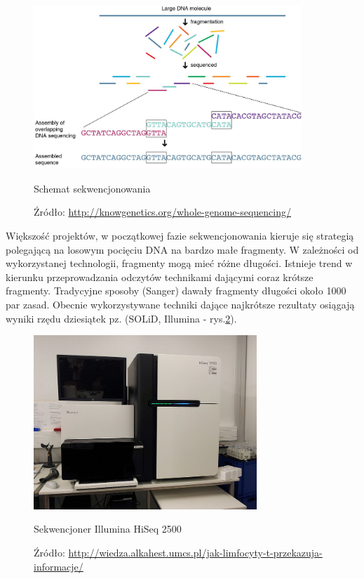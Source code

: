 \begin{figure}[h]
	\centering
	\includegraphics[width=0.9\textwidth]{img/sequenctioning-process.png}
	\caption{Schemat sekwencjonowania}
	\vspace{-0.5cm}
	\caption*{\scriptsize Źródło: \url{http://knowgenetics.org/whole-genome-sequencing/}}
	\label{img:schemat-sekwencjonowania}
\end{figure}

Większość projektów, w początkowej fazie sekwencjonowania kieruje się strategią polegającą na losowym pocięciu DNA na bardzo małe fragmenty.
W zależności od wykorzystanej technologii, fragmenty mogą mieć różne długości. Istnieje trend w kierunku przeprowadzania odczytów technikami dającymi coraz krótsze fragmenty. 
Tradycyjne sposoby (Sanger) dawały fragmenty długości około 1000 par zasad. Obecnie wykorzystywane techniki dające najkrótsze rezultaty osiągają wyniki rzędu dziesiątek pz. (SOLiD, Illumina - rys.\ref{img:sekwencjoner-illumina}).

\begin{figure}[h]
	\centering
	\includegraphics[width=0.75\textwidth]{img/sekwencjoner-illumina.jpg}
	\caption{Sekwencjoner Illumina HiSeq 2500}
	\vspace{-0.5cm}
	\caption*{\scriptsize Źródło: \url{http://wiedza.alkahest.umcs.pl/jak-limfocyty-t-przekazuja-informacje/}}
	\label{img:sekwencjoner-illumina}
\end{figure}

